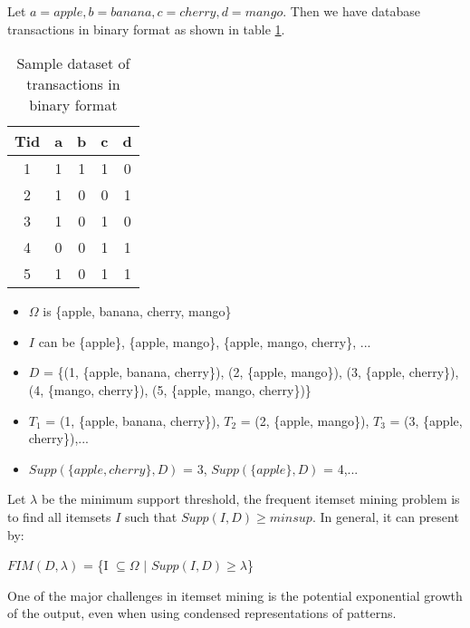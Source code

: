 Let $a = apple, b = banana, c = cherry, d = mango$.
Then we have database transactions in binary format as shown in table \ref{tab:example_dataset_convert_to_binary}.

\begin{table}[H]
    \centering
    \caption{Sample dataset of transactions in binary format}
    \label{tab:example_dataset_convert_to_binary}
    \begin{tabular}{|c| c c c c |}
        \hline
        \textbf{Tid} & \textbf{a} & \textbf{b} & \textbf{c} & \textbf{d} \\
        \hline
        1            & 1          & 1          & 1          & 0          \\
        2            & 1          & 0          & 0          & 1          \\
        3            & 1          & 0          & 1          & 0          \\
        4            & 0          & 0          & 1          & 1          \\
        5            & 1          & 0          & 1          & 1          \\
        \hline
    \end{tabular}
\end{table}

\begin{itemize}
    \item $\Omega$ is \{apple, banana, cherry, mango\}
    \item $I$ can be \{apple\}, \{apple, mango\}, \{apple, mango, cherry\}, ...
    \item $D$ = \{(1, \{apple, banana, cherry\}), (2, \{apple, mango\}), (3, \{apple, cherry\}), (4, \{mango, cherry\}), (5, \{apple, mango, cherry\})\}
    \item $T_1$ = (1, \{apple, banana, cherry\}), $T_2$ = (2, \{apple, mango\}), $T_3$ = (3, \{apple, cherry\}),...
    \item $Supp(\{apple, cherry\}, D)$ = 3, $Supp(\{apple\}, D)$ = 4,...
\end{itemize}
Let $\lambda$ be the minimum support threshold,
the frequent itemset mining problem is to find all itemsets $I$ such that $Supp(I, D) \geq minsup$. In general, it can present by:

\begin{center}
    $FIM(D,\lambda)$ = \{I $\subseteq \Omega$ $|$ $Supp(I, D) \geq \lambda$\}
\end{center}

One of the major challenges in itemset mining is the potential exponential growth of the output, even when using condensed representations of patterns.
